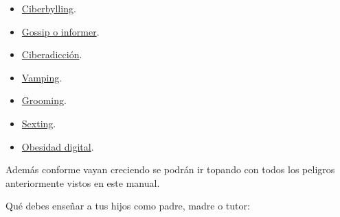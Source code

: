 \documentclass[
  spanish,
  a4paper,
  openany]{book}
\begin{document}
\begin{itemize}
\item
  \href{https://ayudaenaccion.org/ong/blog/educacion/ciberbullying/}{Ciberbylling}.
\item
  \href{https://educacion2.com/que-es-el-fenomeno-gossip-e-informer/}{Gossip o informer}.
\item
  \href{https://www.aepap.org/sites/default/files/pags._131-142_ciberadicciones.pdf}{Ciberadicción}.
\item
  \href{https://www.educapeques.com/escuela-de-padres/vamping-definicion.html}{Vamping}.
\item
  \href{https://www.is4k.es/necesitas-saber/grooming}{Grooming}.
\item
  \href{https://www.is4k.es/menores-y-sexting}{Sexting}.
\item
  \href{https://www.levantalacabeza.es/obesidad-digital/}{Obesidad digital}.
\end{itemize}

Además conforme vayan creciendo se podrán ir topando con todos los peligros anteriormente vistos en este manual.

Qué debes enseñar a tus hijos como padre, madre o tutor:
\end{document}
